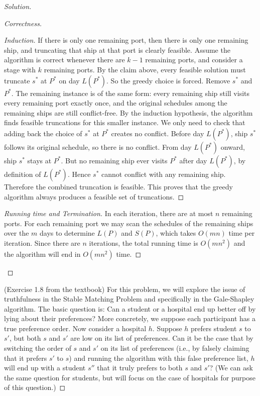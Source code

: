 \documentclass[12pt]{article}
\begin{document}
\begin{enumerate}[leftmargin=*]
\begin{proof}[Solution]
\begin{proof}[Correctness]
\begin{proof}[Induction]
    If there is only one remaining port, then there is only one remaining ship, and truncating that ship at that port is clearly feasible.
    Assume the algorithm is correct whenever there are $k-1$ remaining ports, and consider a stage with $k$ remaining ports. By the claim above, every feasible solution must truncate $s^*$ at $P^*$ on day $L(P^*)$. So the greedy choice is forced. Remove $s^*$ and $P^*$. The remaining instance is of the same form: every remaining ship still visits every remaining port exactly once, and the original schedules among the remaining ships are still conflict-free.
    By the induction hypothesis, the algorithm finds feasible truncations for this smaller instance. We only need to check that adding back the choice of $s^*$ at $P^*$ creates no conflict. Before day $L(P^*)$, ship $s^*$ follows its original schedule, so there is no conflict. From day $L(P^*)$ onward, ship $s^*$ stays at $P^*$. But no remaining ship ever visits $P^*$ after day $L(P^*)$, by definition of $L(P^*)$. Hence $s^*$ cannot conflict with any remaining ship. Therefore the combined truncation is feasible.
    This proves that the greedy algorithm always produces a feasible set of truncations.
    \end{proof}

    \begin{proof}[Running time and Termination]
    In each iteration, there are at most $n$ remaining ports. For each remaining port we may scan the schedules of the remaining ships over the $m$ days to determine $L(P)$ and $S(P)$, which takes $O(mn)$ time per iteration. Since there are $n$ iterations, the total running time is $O(mn^2)$ and the algorithm will end in $O(mn^2)$ time.
    \end{proof}
\end{proof}


\item (Exercise 1.8 from the textbook) For this problem, we will explore the issue of truthfulness in the Stable Matching Problem and specifically in the Gale-Shapley algorithm. The basic question is: Can a student or a hospital end up better off by lying about their preferences? More concretely, we suppose each participant has a true preference order. Now consider a hospital $h$. Suppose $h$ prefers student $s$ to $s'$, but both $s$ and $s'$ are low on its list of preferences. Can it be the case that by switching the order of $s$ and $s'$ on its list of preferences (i.e., by falsely claiming that it prefers $s'$ to $s$) and running the algorithm with this false preference list, $h$ will end up with a student $s''$ that it truly prefers to both $s$ and $s'$? (We can ask the same question for students, but will focus on the case of hospitals for purpose of this question.)


\end{proof}
\end{enumerate}
\end{document}
